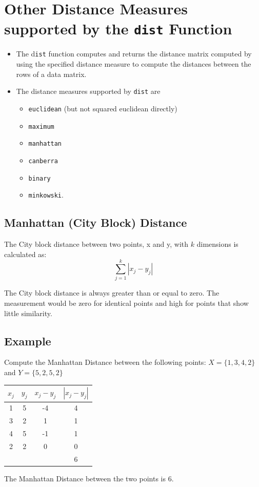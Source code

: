 \documentclass[a4paper,12pt]{report}
\begin{document}
\section{Other Distance Measures supported by the \texttt{dist} Function}
\begin{itemize}
	\item The d\texttt{ist} function computes and returns the distance matrix computed by using the specified distance measure to compute the distances between the rows of a data matrix.
	\item 
	The distance measures supported by \texttt{dist} are
	
	\begin{itemize}
		\item \texttt{euclidean} (but not squared euclidean directly)
		\item \texttt{maximum}
		\item \texttt{manhattan}
		\item \texttt{canberra}
		\item \texttt{binary} 
		\item \texttt{minkowski}.
	\end{itemize}
\end{itemize}

\subsection{Manhattan (City Block) Distance}
The City block distance between two points, x and y, with $k$ dimensions is calculated as:
\[ \sum^{k}_{j=1} | x_j - y_j |  \]

The City block distance is always greater than or equal to zero. The measurement would be zero for identical points and high for points that show little similarity.

\subsection{Example}
Compute the Manhattan Distance between the following points: 
$X = \{1,3,4,2\}$ and $Y = \{5,2,5,2\}$


\begin{center}
	\begin{tabular}{|c|c|c|c|}
		\hline
		$x_j$	&	$y_j$	&   $x_j - y_j$	&	$| x_j - y_j |$	\\ \hline
		1	&	5	&	-4	&	4	\\
		3	&	2	&	1	&	1	\\
		4	&	5	&	-1	&	1	\\
		2	&	2	&	0	&	0	\\ \hline
		& & & 6 \\
		\hline
	\end{tabular}
\end{center}
The Manhattan Distance between the two points is 6.

\newpage
\end{document}
